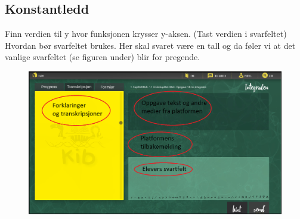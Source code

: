 \documentclass[12pt,twoside,onecolumn]{article}
\begin{document}
\newpage
\newpage
\newpage
\subsection*{Konstantledd}

\begin{Exercise}
Finn verdien til y hvor funksjonen krysser y-aksen. (Tast verdien i svarfeltet) {\color{Cerulean} Hvordan bør svarfeltet brukes. Her skal svaret være en tall og da føler vi at det vanlige svarfeltet (se figuren under) blir for pregende.}
\begin{figure}[h!]
\centering
\includegraphics[scale = 0.3]{figures/Platform_explained.png}
\end{figure}
\end{Exercise}
\end{document}
